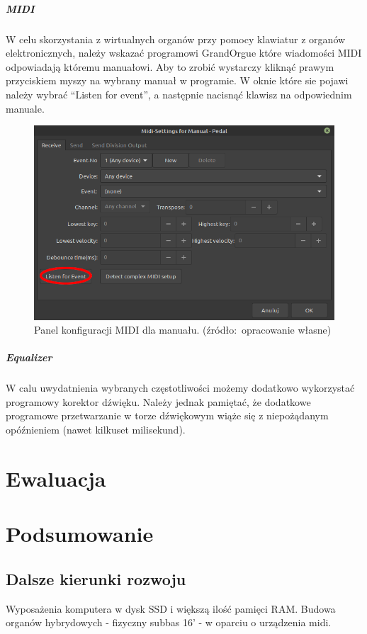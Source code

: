 \documentclass[11pt]{report}
\begin{document}
    \paragraph{MIDI}
    W celu skorzystania z wirtualnych organów przy pomocy klawiatur z organów elektronicznych,
    należy wskazać programowi GrandOrgue które wiadomości MIDI odpowiadają któremu manuałowi.
    Aby to zrobić wystarczy kliknąć prawym przyciskiem myszy na wybrany manuał w programie.
    W oknie które sie pojawi należy wybrać ``Listen for event'', a następnie nacisnąć klawisz na odpowiednim manuale.
    \begin{figure}[!htp]
        \centering
        \includegraphics[width=\linewidth]{fig/midiR.png}
        \caption{Panel konfiguracji MIDI dla manuału. (źródło:~opracowanie własne)}
        \label{fig:midi}
    \end{figure}

    \paragraph{Equalizer}
    W calu uwydatnienia wybranych częstotliwości możemy dodatkowo wykorzystać programowy korektor dźwięku.
    Należy jednak pamiętać, że dodatkowe programowe przetwarzanie w torze dźwiękowym wiąże się z niepożądanym opóźnieniem (nawet kilkuset milisekund).


    \chapter{Ewaluacja}


    \chapter{Podsumowanie}


    \section{Dalsze kierunki rozwoju}
    Wyposażenia komputera w dysk SSD i większą ilość pamięci RAM.
    Budowa organów hybrydowych - fizyczny subbas 16' - w oparciu o urządzenia midi.


    \newpage

    \printbibliography[title={Bibliografia}]
\end{document}
